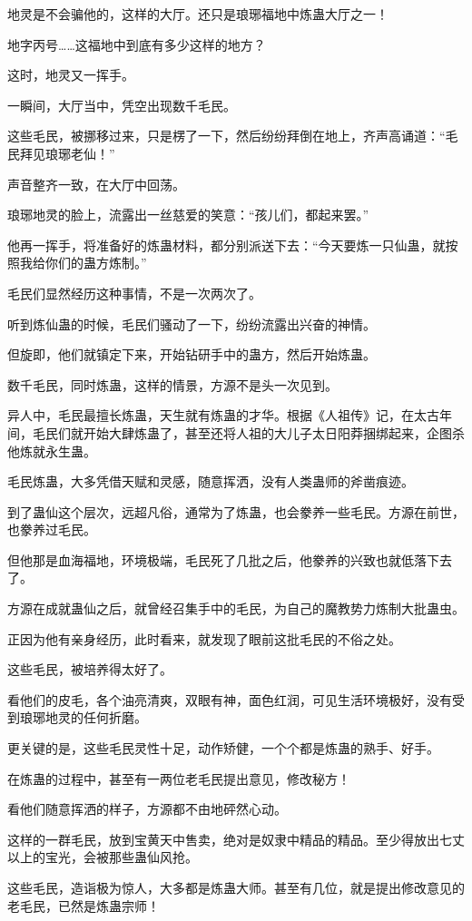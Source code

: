 \begin{this_body}
地灵是不会骗他的，这样的大厅。还只是琅琊福地中炼蛊大厅之一！

地字丙号……这福地中到底有多少这样的地方？

这时，地灵又一挥手。

一瞬间，大厅当中，凭空出现数千毛民。

这些毛民，被挪移过来，只是楞了一下，然后纷纷拜倒在地上，齐声高诵道：“毛民拜见琅琊老仙！”

声音整齐一致，在大厅中回荡。

琅琊地灵的脸上，流露出一丝慈爱的笑意：“孩儿们，都起来罢。”

他再一挥手，将准备好的炼蛊材料，都分别派送下去：“今天要炼一只仙蛊，就按照我给你们的蛊方炼制。”

毛民们显然经历这种事情，不是一次两次了。

听到炼仙蛊的时候，毛民们骚动了一下，纷纷流露出兴奋的神情。

但旋即，他们就镇定下来，开始钻研手中的蛊方，然后开始炼蛊。

数千毛民，同时炼蛊，这样的情景，方源不是头一次见到。

异人中，毛民最擅长炼蛊，天生就有炼蛊的才华。根据《人祖传》记，在太古年间，毛民们就开始大肆炼蛊了，甚至还将人祖的大儿子太日阳莽捆绑起来，企图杀他炼就永生蛊。

毛民炼蛊，大多凭借天赋和灵感，随意挥洒，没有人类蛊师的斧凿痕迹。

到了蛊仙这个层次，远超凡俗，通常为了炼蛊，也会豢养一些毛民。方源在前世，也豢养过毛民。

但他那是血海福地，环境极端，毛民死了几批之后，他豢养的兴致也就低落下去了。

方源在成就蛊仙之后，就曾经召集手中的毛民，为自己的魔教势力炼制大批蛊虫。

正因为他有亲身经历，此时看来，就发现了眼前这批毛民的不俗之处。

这些毛民，被培养得太好了。

看他们的皮毛，各个油亮清爽，双眼有神，面色红润，可见生活环境极好，没有受到琅琊地灵的任何折磨。

更关键的是，这些毛民灵性十足，动作矫健，一个个都是炼蛊的熟手、好手。

在炼蛊的过程中，甚至有一两位老毛民提出意见，修改秘方！

看他们随意挥洒的样子，方源都不由地砰然心动。

这样的一群毛民，放到宝黄天中售卖，绝对是奴隶中精品的精品。至少得放出七丈以上的宝光，会被那些蛊仙风抢。

这些毛民，造诣极为惊人，大多都是炼蛊大师。甚至有几位，就是提出修改意见的老毛民，已然是炼蛊宗师！


\end{this_body}
